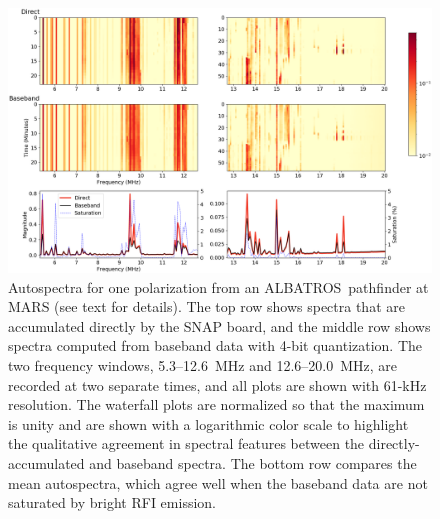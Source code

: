 \documentclass{ws-jai}
\def\albatros{ALBATROS}
\begin{document}
\begin{figure}[t]
  \begin{center}
    \includegraphics[width=\linewidth]{Figures/baseband_direct_auto_compare.png}
    \caption{Autospectra for one polarization from an
      \albatros\ pathfinder at MARS (see text for details).  The top
      row shows spectra that are accumulated directly by the SNAP
      board, and the middle row shows spectra computed from baseband
      data with 4-bit quantization.  The two frequency windows,
      5.3--12.6~MHz and 12.6--20.0~MHz, are recorded at two separate
      times, and all plots are shown with 61-kHz resolution.  The
      waterfall plots are normalized so that the maximum is unity and
      are shown with a logarithmic color scale to highlight the
      qualitative agreement in spectral features between the
      directly-accumulated and baseband spectra.  The bottom row
      compares the mean autospectra, which agree well when the
      baseband data are not saturated by bright RFI emission.}
    \label{Fig:baseband_direct_auto}
  \end{center}
\end{figure}
\end{document}
